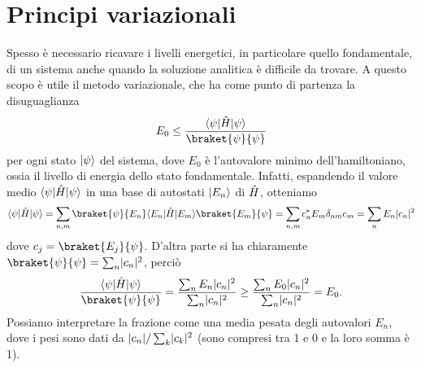 \section{Principi variazionali}
Spesso è necessario ricavare i livelli energetici, in particolare quello fondamentale, di un sistema anche quando la soluzione analitica è difficile da trovare.
A questo scopo è utile il metodo variazionale, che ha come punto di partenza la disuguaglianza
\begin{equation}
	E_0\le\frac{\bra{\psi}\op H\ket{\psi}}{\braket{\psi}{\psi}}
	\label{eq:principio-variazionale}
\end{equation}
per ogni stato $\lvert\psi\rangle$ del sistema, dove $E_0$ è l'autovalore minimo dell'hamiltoniano, ossia il livello di energia dello stato fondamentale.
Infatti, espandendo il valore medio $\langle\psi\rvert\hat{H}\lvert\psi\rangle$ in una base di autostati $\lvert E_n\rangle$ di $\hat{H}$, otteniamo
\begin{equation}
	\bra{\psi}\op H\ket{\psi}=\sum_{n,m}\braket{\psi}{E_n}\bra{E_n}\op H\ket{E_m}\braket{E_m}{\psi}=\sum_{n,m}c_n^*E_m\delta_{nm}c_m=\sum_nE_n\abs{c_n}^2
\end{equation}
dove $c_j=\braket{E_j}{\psi}$.
D'altra parte si ha chiaramente $\braket{\psi}{\psi}=\sum_n\abs{c_n}^2$, perciò
\begin{equation}
	\frac{\bra{\psi}\op H\ket{\psi}}{\braket{\psi}{\psi}}=\frac{\sum_nE_n\abs{c_n}^2}{\sum_n\abs{c_n}^2}\ge\frac{\sum_nE_0\abs{c_n}^2}{\sum_n\abs{c_n}^2}=E_0.
\end{equation}
Possiamo interpretare la frazione come una media pesata degli autovalori $E_n$, dove i pesi sono dati da $\lvert c_n\rvert/\sum_k\lvert c_k\rvert^2$ (sono compresi tra 1 e 0 e la loro somma è 1).

